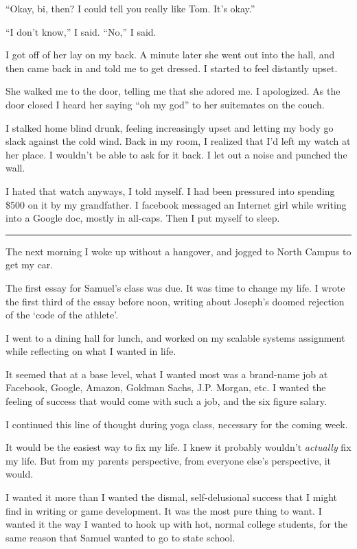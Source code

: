 ``Okay, bi, then?  I could tell you really like Tom.  It's okay.''

``I don't know,'' I said.  ``No,'' I said.

I got off of her lay on my back.  A minute later she went out into the hall, and
then came back in and told me to get dressed.  I started to feel distantly
upset.

She walked me to the door, telling me that she adored me.  I apologized.  As the
door closed I heard her saying ``oh my god'' to her suitemates on the couch.

I stalked home blind drunk, feeling increasingly upset and letting my body go
slack against the cold wind.  Back in my room, I realized that I'd left my watch
at her place.  I wouldn't be able to ask for it back.  I let out a noise and
punched the wall. 

I hated that watch anyways, I told myself. I had been pressured into spending
\$500 on it by my grandfather.  I facebook messaged an Internet girl while
writing into a Google doc, mostly in all-caps.  Then I put myself to sleep.

\plainfancybreak{12pt}{2}{* * *}

The next morning I woke up without a hangover, and jogged to North Campus to get
my car.  

The first essay for Samuel's class was due.  It was time to change my life.  I
wrote the first third of the essay before noon, writing about Joseph's doomed
rejection of the `code of the athlete'.

I went to a dining hall for lunch, and worked on my scalable systems assignment
while reflecting on what I wanted in life.

It seemed that at a base level, what I wanted most was a brand-name job at
Facebook, Google, Amazon, Goldman Sachs, J.P.  Morgan, etc.  I wanted the
feeling of success that would come with such a job, and the six figure salary.

I continued this line of thought during yoga class, necessary for the coming
week.

It would be the easiest way to fix my life.  I knew it probably wouldn't
\textit{actually} fix my life.  But from my parents perspective, from everyone
else's perspective, it would.  

I wanted it more than I wanted the dismal, self-delusional success that I might
find in writing or game development.  It was the most pure thing to want. I
wanted it the way I wanted to hook up with hot, normal college students, for the
same reason that Samuel wanted to go to state school. 


